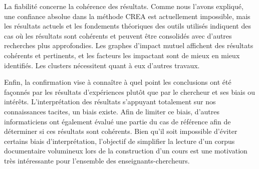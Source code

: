 La fiabilité concerne la cohérence des résultats.
Comme nous l'avons expliqué, une confiance absolue dans la méthode CREA est actuellement impossible, mais les résultats actuels et les fondements théoriques des outils utilisés indiquent des cas où les résultats sont cohérents et peuvent être consolidés avec d'autres recherches plus approfondies.
Les graphes d'impact mutuel affichent des résultats cohérents et pertinents, et les facteurs les impactant sont de mieux en mieux identifiés.
Les clusters nécessitent quant à eux d'autres travaux.

\bigskip

Enfin, la confirmation vise à connaître à quel point les conclusions ont été façonnés par les résultats d'expériences plutôt que par le chercheur et ses biais ou intérêts.
L'interprétation des résultats s'appuyant totalement sur nos connaissances tacites, un biais existe.
Afin de limiter ce biais, d'autres informaticiens ont également évalué une partie du cas de référence afin de déterminer si ces résultats sont cohérents.
Bien qu'il soit impossible d'éviter certains biais d'interprétation, l'objectif de simplifier la lecture d'un corpus documentaire volumineux lors de la construction d'un cours est une motivation très intéressante pour l'ensemble des enseignants-chercheurs.





\clearpage %
\newpage   %




